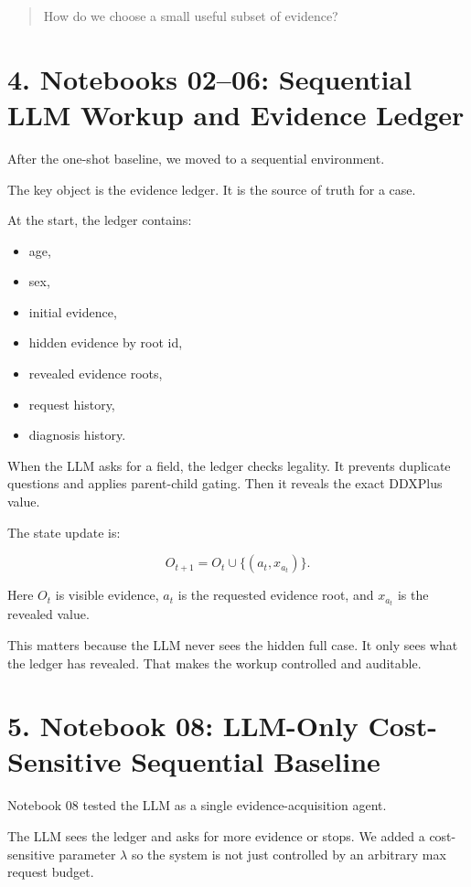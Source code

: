 \documentclass[11pt]{article}
\begin{document}
\begin{quote}
How do we choose a small useful subset of evidence?
\end{quote}

\section*{4. Notebooks 02--06: Sequential LLM Workup and Evidence Ledger}

After the one-shot baseline, we moved to a sequential environment.

The key object is the evidence ledger. It is the source of truth for a case.

At the start, the ledger contains:

\begin{itemize}[leftmargin=*]
    \item age,
    \item sex,
    \item initial evidence,
    \item hidden evidence by root id,
    \item revealed evidence roots,
    \item request history,
    \item diagnosis history.
\end{itemize}

When the LLM asks for a field, the ledger checks legality. It prevents duplicate questions and applies parent-child gating. Then it reveals the exact DDXPlus value.

The state update is:

\[
O_{t+1}=O_t \cup \{(a_t,x_{a_t})\}.
\]

Here $O_t$ is visible evidence, $a_t$ is the requested evidence root, and $x_{a_t}$ is the revealed value.

This matters because the LLM never sees the hidden full case. It only sees what the ledger has revealed. That makes the workup controlled and auditable.

\section*{5. Notebook 08: LLM-Only Cost-Sensitive Sequential Baseline}

Notebook 08 tested the LLM as a single evidence-acquisition agent.

The LLM sees the ledger and asks for more evidence or stops. We added a cost-sensitive parameter $\lambda$ so the system is not just controlled by an arbitrary max request budget.
\end{document}
